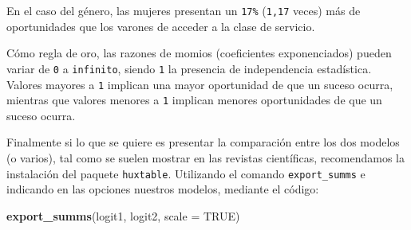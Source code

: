 \documentclass[
]{article}
\newenvironment{Shaded}{\begin{snugshade}}{\end{snugshade}}
\newcommand{\AttributeTok}[1]{\textcolor[rgb]{0.13,0.29,0.53}{#1}}
\newcommand{\ConstantTok}[1]{\textcolor[rgb]{0.56,0.35,0.01}{#1}}
\newcommand{\FunctionTok}[1]{\textcolor[rgb]{0.13,0.29,0.53}{\textbf{#1}}}
\newcommand{\NormalTok}[1]{#1}
\begin{document}
En el caso del género, las mujeres presentan un \texttt{17\%} (\texttt{1,17} veces) más de oportunidades que los varones de acceder a la clase de servicio.

Cómo regla de oro, las razones de momios (coeficientes exponenciados) pueden variar de \texttt{0} a \texttt{infinito}, siendo \texttt{1} la presencia de independencia estadística. Valores mayores a \texttt{1} implican una mayor oportunidad de que un suceso ocurra, mientras que valores menores a \texttt{1} implican menores oportunidades de que un suceso ocurra.

Finalmente si lo que se quiere es presentar la comparación entre los dos modelos (o varios), tal como se suelen mostrar en las revistas científicas, recomendamos la instalación del paquete \texttt{huxtable}. Utilizando el comando \texttt{export\_summs} e indicando en las opciones nuestros modelos, mediante el código:

\begin{Shaded}
\begin{Highlighting}[]
\FunctionTok{export\_summs}\NormalTok{(logit1, logit2, }\AttributeTok{scale =} \ConstantTok{TRUE}\NormalTok{)}
\end{Highlighting}
\end{Shaded}

 
  \providecommand{\huxb}[2]{\arrayrulecolor[RGB]{#1}\global\arrayrulewidth=#2pt}
  \providecommand{\huxvb}[2]{\color[RGB]{#1}\vrule width #2pt}
  \providecommand{\huxtpad}[1]{\rule{0pt}{#1}}
  \providecommand{\huxbpad}[1]{\rule[-#1]{0pt}{#1}}
\end{document}
